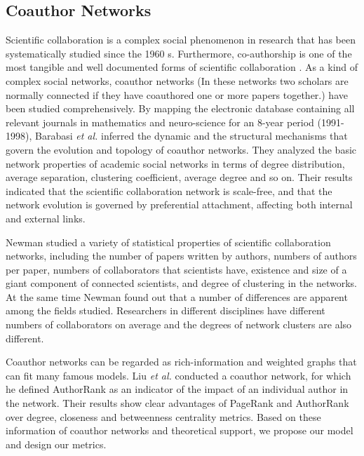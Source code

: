 \documentclass[10pt,journal,compsoc]{IEEEtran}
\begin{document}
\subsection{Coauthor Networks}
Scientific collaboration is a complex social phenomenon in research that has been systematically studied since the 1960 s. Furthermore, co-authorship is one of the most tangible and well documented forms of scientific collaboration \cite{glanzel2005analysing}. As a kind of complex social networks, coauthor networks (In these networks two scholars are normally connected if they have coauthored one or more papers together.) have been studied comprehensively. By mapping the electronic database containing all relevant journals in mathematics and neuro-science for an 8-year period (1991-1998), Barabasi \textit{et al.} \cite{Barabasi:evolution} inferred the dynamic and the structural mechanisms that govern the evolution and topology of coauthor networks. They analyzed the basic network properties of academic social networks in terms of  degree distribution, average separation, clustering coefficient, average degree and so on. Their results indicated that the scientific collaboration network is scale-free, and that the network evolution is governed by preferential attachment, affecting both internal and external links.

Newman \cite{Newman:scientific} studied a variety of statistical properties of scientific collaboration networks, including the number of papers written by authors, numbers of authors per paper, numbers of collaborators that scientists have, existence and size of a giant component of connected scientists, and degree of clustering in the networks. At the same time Newman \cite{Newman:scientific} found out that  a number of differences are apparent among the fields studied. Researchers in different disciplines have different numbers of collaborators on average and the degrees of network clusters are also different.

Coauthor networks can be regarded as rich-information and weighted graphs that can fit many famous models. Liu \textit{et al.} \cite{liu2005co} conducted a coauthor network, for which he defined AuthorRank as an indicator of the impact of an individual author in the network. Their results show clear advantages of PageRank and AuthorRank over degree, closeness and betweenness centrality metrics.
Based on these information of coauthor networks and theoretical support, we propose our model and design our metrics.
\end{document}
